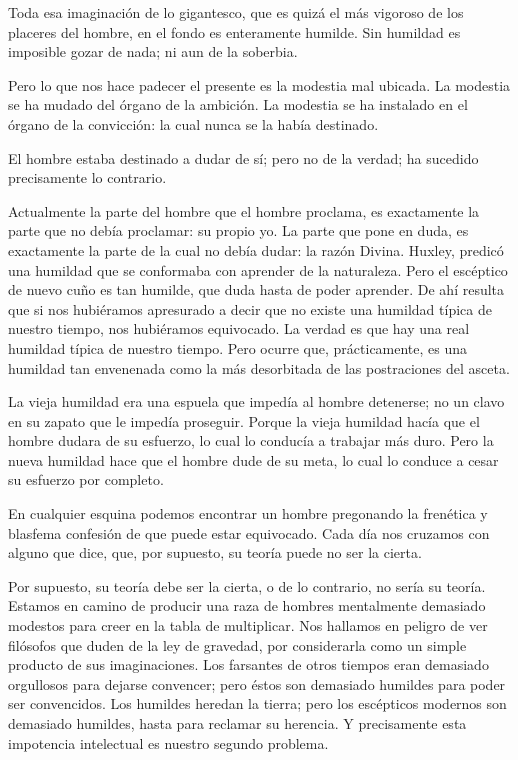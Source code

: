 Toda esa imaginación de lo gigantesco, que es quizá el más vigoroso de los placeres del hombre, en el
fondo es enteramente humilde. Sin humildad es imposible gozar de nada; ni aun de la soberbia.

Pero lo que nos hace padecer el presente es la modestia mal ubicada. La modestia se ha mudado del
órgano de la ambición. La modestia se ha instalado en el órgano de la convicción: la cual nunca se la
había destinado.

El hombre estaba destinado a dudar de sí; pero no de la verdad; ha sucedido precisamente lo
contrario.

Actualmente la parte del hombre que el hombre proclama, es exactamente la parte que no debía
proclamar: su propio yo. La parte que pone en duda, es exactamente la parte de la cual no debía dudar: la
razón Divina. Huxley, predicó una humildad que se conformaba con aprender de la naturaleza. Pero el
escéptico de nuevo cuño es tan humilde, que duda hasta de poder aprender. De ahí resulta que si nos
hubiéramos apresurado a decir que no existe una humildad típica de nuestro tiempo, nos hubiéramos
equivocado. La verdad es que hay una real humildad típica de nuestro tiempo. Pero ocurre que,
prácticamente, es una humildad tan envenenada como la más desorbitada de las postraciones del asceta.

La vieja humildad era una espuela que impedía al hombre detenerse; no un clavo en su zapato que le
impedía proseguir. Porque la vieja humildad hacía que el hombre dudara de su esfuerzo, lo cual lo
conducía a trabajar más duro. Pero la nueva humildad hace que el hombre dude de su meta, lo cual lo
conduce a cesar su esfuerzo por completo.

En cualquier esquina podemos encontrar un hombre pregonando la frenética y blasfema confesión
de que puede estar equivocado. Cada día nos cruzamos con alguno que dice, que, por supuesto, su teoría
puede no ser la cierta.

Por supuesto, su teoría debe ser la cierta, o de lo contrario, no sería su teoría. Estamos en camino de
producir una raza de hombres mentalmente demasiado modestos para creer en la tabla de multiplicar. Nos
hallamos en peligro de ver filósofos que duden de la ley de gravedad, por considerarla como un simple
producto de sus imaginaciones. Los farsantes de otros tiempos eran demasiado orgullosos para dejarse
convencer; pero éstos son demasiado humildes para poder ser convencidos. Los humildes heredan la
tierra; pero los escépticos modernos son demasiado humildes, hasta para reclamar su herencia. Y
precisamente esta impotencia intelectual es nuestro segundo problema.

